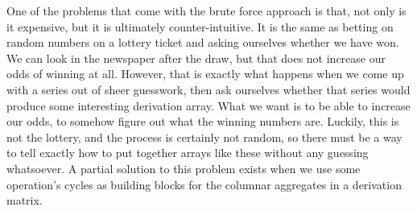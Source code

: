 One of the problems that come with the brute force approach is that, not only is it expensive, but it is ultimately counter-intuitive. It is the same as betting on random numbers on a lottery ticket and asking ourselves whether we have won. We can look in the newspaper after the draw, but that does not increase our odds of winning at all. However, that is exactly what happens when we come up with a series out of sheer guesswork, then ask ourselves whether that series would produce some interesting derivation array. What we want is to be able to increase our odds, to somehow figure out what the winning numbers are. Luckily, this is not the lottery, and the process is certainly not random, so there must be a way to tell exactly how to put together arrays like these without any guessing whatsoever. A partial solution to this problem exists when we use some operation's cycles as building blocks for the columnar aggregates in a derivation matrix.

